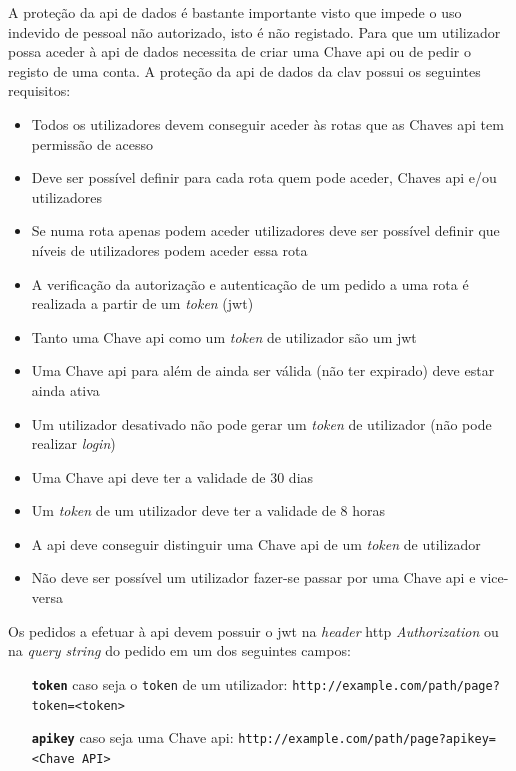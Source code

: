 A proteção da \acrshort{api} de dados é bastante importante visto que impede o uso indevido de pessoal não autorizado, isto é não registado. Para que um utilizador possa aceder à \acrshort{api} de dados necessita de criar uma Chave \acrshort{api} ou de pedir o registo de uma conta. A proteção da \acrshort{api} de dados da \acrshort{clav} possui os seguintes requisitos:
\begin{itemize}
    \item Todos os utilizadores devem conseguir aceder às rotas que as Chaves \acrshort{api} tem permissão de acesso
    \item Deve ser possível definir para cada rota quem pode aceder, Chaves \acrshort{api} e/ou utilizadores
    \item Se numa rota apenas podem aceder utilizadores deve ser possível definir que níveis de utilizadores podem aceder essa rota
    \item A verificação da autorização e autenticação de um pedido a uma rota é realizada a partir de um \textit{token} (\acrshort{jwt})
    \item Tanto uma Chave \acrshort{api} como um \textit{token} de utilizador são um \acrshort{jwt}
    \item Uma Chave \acrshort{api} para além de ainda ser válida (não ter expirado) deve estar ainda ativa
    \item Um utilizador desativado não pode gerar um \textit{token} de utilizador (não pode realizar \textit{login})
    \item Uma Chave \acrshort{api} deve ter a validade de 30 dias
    \item Um \textit{token} de um utilizador deve ter a validade de 8 horas
    \item A \acrshort{api} deve conseguir distinguir uma Chave \acrshort{api} de um \textit{token} de utilizador
    \item Não deve ser possível um utilizador fazer-se passar por uma Chave \acrshort{api} e vice-versa
\end{itemize}

Os pedidos a efetuar à \acrshort{api} devem possuir o \acrshort{jwt} na \textit{header} \acrshort{http} \textit{Authorization} ou na \textit{query string} do pedido em um dos seguintes campos:
\begin{itemize}[leftmargin=3cm]
    \item[\textbf{\texttt{token}}] caso seja o \texttt{token} de um utilizador:\newline
        \verb|http://example.com/path/page?token=<token>|
    \item[\textbf{\texttt{apikey}}] caso seja uma Chave \acrshort{api}:\newline
        \verb|http://example.com/path/page?apikey=<Chave API>|
\end{itemize}

